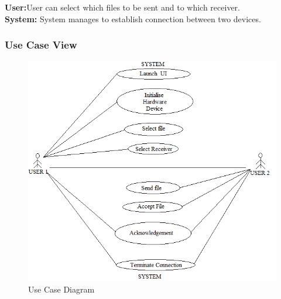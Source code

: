 \documentclass[12pt,a4paper]
{article}
\numberwithin{table}{section}
\begin{document}
{{{{{{\textbf{User:}User can select which files to be sent and to which receiver.\\
\textbf{System: }System manages to establish connection between two devices.\\





\subsubsection{Use Case View}
\begin{center}
	  \begin{figure}[h]
			\centering
			\includegraphics[width=18 cm , height= 15 cm]{UseCase.PNG}
			\caption{Use Case Diagram}
		\end{figure}
	\end{center}
	
}}}}}}
\end{document}
